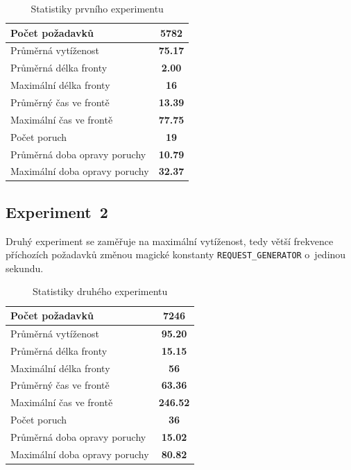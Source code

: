 \documentclass[a4paper, 11pt]{article}
\begin{document}
    \begin{table}[ht!]
        \centering
        \begin{tabular}{|l|c|}
            \hline
            Počet požadavků & \textbf{5782} \\ \hline
            Průměrná vytíženost & \textbf{75.17} \\ \hline
            Průměrná délka fronty & \textbf{2.00} \\ \hline
            Maximální délka fronty & \textbf{16} \\ \hline
            Průměrný čas ve frontě & \textbf{13.39} \\ \hline
            Maximální čas ve frontě & \textbf{77.75} \\ \hline
            Počet poruch & \textbf{19} \\ \hline
            Průměrná doba opravy poruchy & \textbf{10.79} \\ \hline
            Maximální doba opravy poruchy & \textbf{32.37} \\ \hline
        \end{tabular}
        \caption{Statistiky prvního experimentu}
    \end{table}

\subsection{Experiment~2}
    Druhý experiment se zaměřuje na maximální vytíženost, tedy větší frekvence příchozích požadavků změnou magické konstanty \texttt{REQUEST\_GENERATOR} o~jedinou sekundu.

    \begin{table}[ht!]
        \centering
        \begin{tabular}{|l|c|}
            \hline
            Počet požadavků & \textbf{7246} \\ \hline
            Průměrná vytíženost & \textbf{95.20} \\ \hline
            Průměrná délka fronty & \textbf{15.15} \\ \hline
            Maximální délka fronty & \textbf{56} \\ \hline
            Průměrný čas ve frontě & \textbf{63.36} \\ \hline
            Maximální čas ve frontě & \textbf{246.52} \\ \hline
            Počet poruch & \textbf{36} \\ \hline
            Průměrná doba opravy poruchy & \textbf{15.02} \\ \hline
            Maximální doba opravy poruchy & \textbf{80.82} \\ \hline
        \end{tabular}
        \caption{Statistiky druhého experimentu}
    \end{table}
\end{document}
